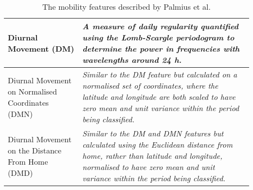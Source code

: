 \begin{table}[]
\begin{tabular}{|p{}|p{}|}
Diurnal Movement (DM)                            & \textit{A measure of daily regularity quantified using the Lomb-Scargle periodogram to determine the power in frequencies with wavelengths around 24 h.}                        \\ \hline
Diurnal Movement on Normalised Coordinates (DMN) & \textit{Similar to the DM feature but calculated on a normalised set of coordinates, where the latitude and longitude are both scaled to have zero mean and unit variance within the period being classified.}            \\ \hline
Diurnal Movement on the Distance From Home (DMD) & \textit{Similar to the DM and DMN features but calculated using the Euclidean distance from home, rather than latitude and longitude, normalised to have zero mean and unit variance within the period being classified.} \\ \hline
\end{tabular}
    \caption{The mobility features described by Palmius et al. \cite{palmius2017}}
    \label{tab:palmius-features}
\end{table}